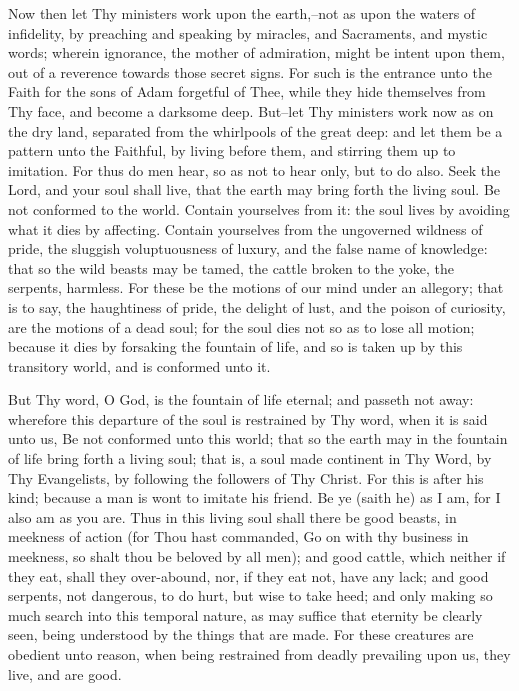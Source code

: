 \documentclass[b5paper,openright,12pt,twoside]{book}
\begin{document}
Now then let Thy ministers work upon the earth,--not as upon the waters
of infidelity, by preaching and speaking by miracles, and Sacraments,
and mystic words; wherein ignorance, the mother of admiration, might
be intent upon them, out of a reverence towards those secret signs. For
such is the entrance unto the Faith for the sons of Adam forgetful of
Thee, while they hide themselves from Thy face, and become a darksome
deep. But--let Thy ministers work now as on the dry land, separated from
the whirlpools of the great deep: and let them be a pattern unto the
Faithful, by living before them, and stirring them up to imitation. For
thus do men hear, so as not to hear only, but to do also. Seek the Lord,
and your soul shall live, that the earth may bring forth the living
soul. Be not conformed to the world. Contain yourselves from it: the
soul lives by avoiding what it dies by affecting. Contain yourselves
from the ungoverned wildness of pride, the sluggish voluptuousness of
luxury, and the false name of knowledge: that so the wild beasts may be
tamed, the cattle broken to the yoke, the serpents, harmless. For
these be the motions of our mind under an allegory; that is to say, the
haughtiness of pride, the delight of lust, and the poison of curiosity,
are the motions of a dead soul; for the soul dies not so as to lose all
motion; because it dies by forsaking the fountain of life, and so is
taken up by this transitory world, and is conformed unto it.

But Thy word, O God, is the fountain of life eternal; and passeth not
away: wherefore this departure of the soul is restrained by Thy word,
when it is said unto us, Be not conformed unto this world; that so the
earth may in the fountain of life bring forth a living soul; that is,
a soul made continent in Thy Word, by Thy Evangelists, by following the
followers of Thy Christ. For this is after his kind; because a man is
wont to imitate his friend. Be ye (saith he) as I am, for I also am
as you are. Thus in this living soul shall there be good beasts, in
meekness of action (for Thou hast commanded, Go on with thy business in
meekness, so shalt thou be beloved by all men); and good cattle, which
neither if they eat, shall they over-abound, nor, if they eat not, have
any lack; and good serpents, not dangerous, to do hurt, but wise to take
heed; and only making so much search into this temporal nature, as may
suffice that eternity be clearly seen, being understood by the things
that are made. For these creatures are obedient unto reason, when being
restrained from deadly prevailing upon us, they live, and are good.
\end{document}

